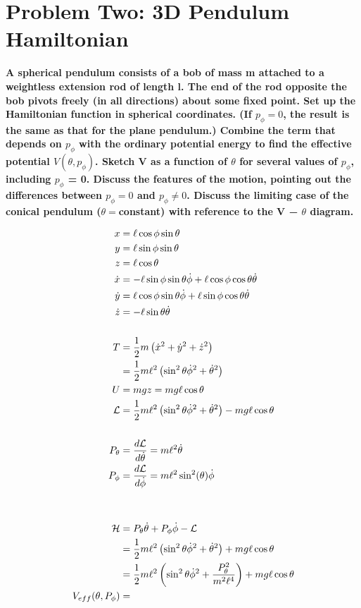 \documentclass[10pt]{article} %
\begin{document}
\section{Problem Two: 3D Pendulum Hamiltonian}

\textbf{A spherical pendulum consists of a bob of mass m attached to a weightless extension rod of length l. The end of the rod opposite the bob pivots freely (in all directions) about some fixed point. Set up the Hamiltonian function in spherical coordinates. (If $p_{\phi}=0$, the result is the same as that for the plane pendulum.) Combine the term that depends on $p_{\phi}$ with the ordinary potential energy to find the effective potential $V(\theta,p_{\phi})$. Sketch V as a function of $\theta$ for several values of $p_{\phi}$, including $p_{\phi}$ = 0. Discuss the features of the motion, pointing out the differences between $p_{\phi}=0$ and $p_{\phi} \neq 0$. Discuss the limiting case of the conical pendulum ($\theta = $constant) with reference to the V − $\theta$ diagram.}

\begin{align*}
  x &= \ell\cos\phi\sin\theta\\
  y &= \ell\sin\phi\sin\theta\\
  z &= \ell\cos\theta\\
  \dot{x} &=  -\ell\sin\phi\sin\theta\dot{\phi} + \ell\cos\phi\cos\theta\dot{\theta}\\
  \dot{y} &= \ell\cos\phi\sin\theta\dot{\phi} + \ell\sin\phi\cos\theta\dot{\theta}\\
  \dot{z} &= -\ell\sin\theta\dot{\theta}\\
  \vspace{1cm}\\
  T &= \frac{1}{2}m\left(\dot{x}^2+\dot{y}^2+\dot{z}^2\right)\\
  &= \frac{1}{2}m\ell^2\left(\sin^2\theta\dot{\phi}^2 + \dot{\theta}^2\right)\\
  U &= mgz = mg\ell\cos\theta\\
  \mathcal{L} &= \frac{1}{2}m\ell^2\left(\sin^2\theta\dot{\phi}^2 + \dot{\theta}^2\right) - mg\ell\cos\theta\\
  \vspace{1cm}\\
  P_{\theta} &= \frac{d\mathcal{L}}{d\dot{\theta}} = m\ell^2\dot{\theta}\\
  P_{\phi} &= \frac{d\mathcal{L}}{d\dot{\phi}} = m\ell^2\sin^2(\theta)\dot{\phi}\\
  \vspace{1cm}\\
  \vspace{1cm}\\
  \mathcal{H} &= P_{\theta}\dot{\theta} + P_{\phi}\dot{\phi} - \mathcal{L}\\
  &= \frac{1}{2}m\ell^2\left(\sin^2\theta\dot{\phi}^2 + \dot{\theta}^2\right) + mg\ell\cos\theta\\
  &= \frac{1}{2}m\ell^2\left(\sin^2\theta\dot{\phi}^2 + \frac{P_{\theta}^2}{m^2\ell^4}\right) + mg\ell\cos\theta\\

    V_{eff}(\theta, P_{\phi}) &=
\end{align*}
\end{document}

